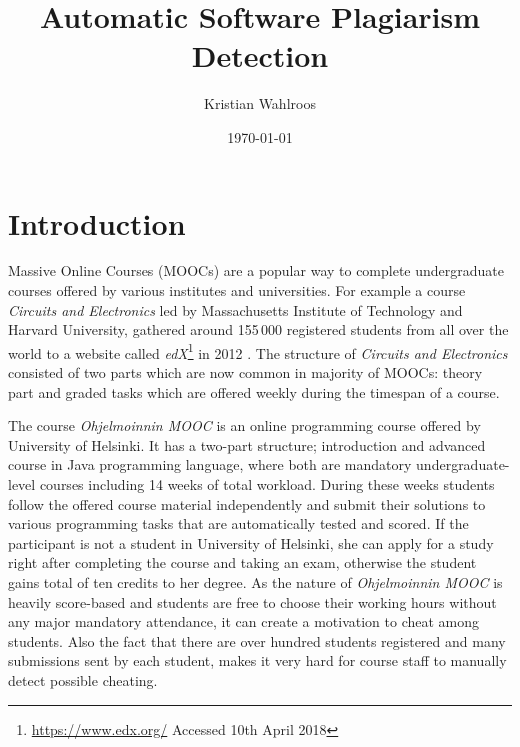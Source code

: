\documentclass[english, grading]{tktltiki2}
\title{Automatic Software Plagiarism Detection}
\author{Kristian Wahlroos}
\date{\today}
\theoremstyle{definition}
\theoremstyle{remark}
\numberwithin{equation}{section} %
\begin{document}
 
\lstset{style=mystyle}



\frontmatter      %

\maketitle        %
\makeabstract     %

\tableofcontents  %


\mainmatter       %

\section{Introduction}


Massive Online Courses (MOOCs) are a popular way to complete undergraduate courses offered by various institutes and universities. For example a course \emph{Circuits and Electronics} led by Massachusetts Institute of Technology and Harvard University, gathered around 155\,000 registered students from all over the world to a website called \emph{edX}\footnote{\url{https://www.edx.org/} Accessed 10th April 2018} in 2012 \cite{SLWCRFM2013}. The structure of \emph{Circuits and Electronics} consisted of two parts which are now common in majority of MOOCs: theory part and graded tasks which are offered weekly during the timespan of a course. 

The course \emph{Ohjelmoinnin MOOC} is an online programming course offered by University of Helsinki. It has a two-part structure; introduction and advanced course in Java programming language, where both are mandatory undergraduate-level courses including 14 weeks of total workload. During these weeks students follow the offered course material independently and submit their solutions to various programming tasks that are automatically tested and scored. If the participant is not a student in University of Helsinki, she can apply for a study right after completing the course and taking an exam, otherwise the student gains total of ten credits to her degree. As the nature of \emph{Ohjelmoinnin MOOC} is heavily score-based and students are free to choose their working hours without any major mandatory attendance, it can create a motivation to cheat among  students. Also the fact that there are over hundred students registered and many submissions sent by each student, makes it very hard for course staff to manually detect possible cheating. 
\end{document}
